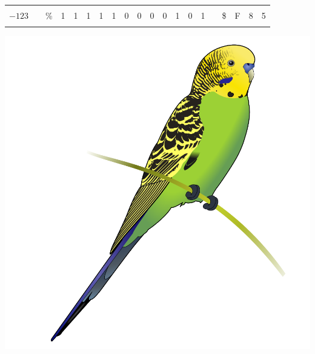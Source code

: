 \documentclass[11pt,a4paper]{article}
\begin{document}
{\begin{tabular}{| c ||c|| c ||C{0.33cm}|C{0.33cm}|C{0.33cm}|C{0.33cm} || C{0.33cm}|C{0.33cm}|C{0.33cm}|C{0.33cm} || C{0.33cm}|C{0.33cm}|C{0.33cm}|C{0.33cm} ||c|| c ||C{0.33cm}|C{0.33cm}|C{0.33cm}| }
                   &  &    & & & & &  &  &  &  & & & &  &  &    & & &                                          \\
\hline
                   &  &    & & & & &  &  &  &  & & & &  &  &    & & &                                          \\
$ -123 $           &  & \% & 1 & 1 & 1 & 1 &  1 &  0 &  0 &  0 & 0 & 1 & 0 & 1 &  & \$ & F & 8 & 5             \\
                   &  &    & & & & &  &  &  &  & & & &  &  &    & & &                                          \\
\hline
\end{tabular}
}


\bigskip

\bigskip




\begin{center}
\includegraphics[scale=0.2]{img/others/Budgerigar_diagram.png}
\end{center}
\end{document}
